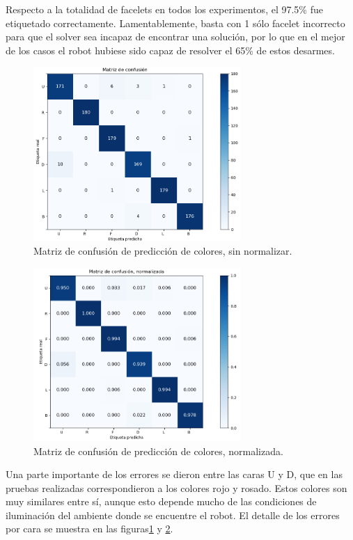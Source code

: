 Respecto a la totalidad de facelets en todos los experimentos, el 97.5\% fue etiquetado correctamente. Lamentablemente, basta con 1 sólo facelet incorrecto para que el solver sea incapaz de encontrar una solución, por lo que en el mejor de los casos el robot hubiese sido capaz de resolver el 65\% de estos desarmes.

\begin{figure}[h!]
	\centering
	\includegraphics[width=0.7\textwidth]{figures/conf_matrix}
	\caption{Matriz de confusión de predicción de colores, sin normalizar.}
	\label{confusion}
\end{figure}
\begin{figure}[h!]
	\centering
	\includegraphics[width=0.7\textwidth]{figures/conf_matrix_norm}
	\caption{Matriz de confusión de predicción de colores, normalizada.}
	\label{confusionnorm}
\end{figure}

Una parte importante de los errores se dieron entre las caras U y D, que en las pruebas realizadas correspondieron a los colores rojo y rosado. Estos colores son muy similares entre sí, aunque esto depende mucho de las condiciones de iluminación del ambiente donde se encuentre el robot. El detalle de los errores por cara se muestra en las figuras\ref{confusion} y \ref{confusionnorm}.



